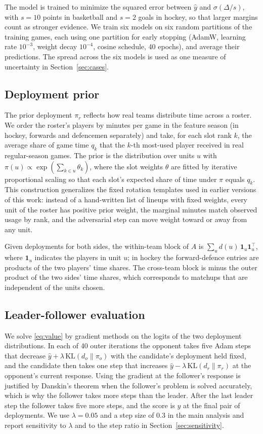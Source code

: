 The model is trained to minimize the squared error between $\hat{y}$ and $\sigma(\Delta/s)$, with $s=10$ points in basketball and $s=2$ goals in hockey, so that larger margins count as stronger evidence. We train six models on six random partitions of the training games, each using one partition for early stopping (AdamW, learning rate $10^{-3}$, weight decay $10^{-4}$, cosine schedule, 40 epochs), and average their predictions. The spread across the six models is used as one measure of uncertainty in Section~\ref{sec:cases}.

\subsection{Deployment prior}
\label{sec:deploy}
The prior deployment $\pi_r$ reflects how real teams distribute time across a roster. We order the roster's players by minutes per game in the feature season (in hockey, forwards and defencemen separately) and take, for each slot rank $k$, the average share of game time $q_k$ that the $k$-th most-used player received in real regular-season games. The prior is the distribution over units $u$ with $\pi(u)\propto\exp(\sum_{k\in u}\theta_k)$, where the slot weights $\theta$ are fitted by iterative proportional scaling so that each slot's expected share of time under $\pi$ equals $q_k$. This construction generalizes the fixed rotation templates used in earlier versions of this work: instead of a hand-written list of lineups with fixed weights, every unit of the roster has positive prior weight, the marginal minutes match observed usage by rank, and the adversarial step can move weight toward or away from any unit.

Given deployments for both sides, the within-team block of $A$ is $\sum_u d(u)\,\mathbf{1}_u\mathbf{1}_u^{\top}$, where $\mathbf{1}_u$ indicates the players in unit $u$; in hockey the forward-defence entries are products of the two players' time shares. The cross-team block is minus the outer product of the two sides' time shares, which corresponds to matchups that are independent of the units chosen.

\subsection{Leader-follower evaluation}
\label{sec:stackelberg}
We solve \eqref{eq:value} by gradient methods on the logits of the two deployment distributions. In each of 40 outer iterations the opponent takes five Adam steps that decrease $\hat{y}+\lambda\,\mathrm{KL}(d_o\|\pi_o)$ with the candidate's deployment held fixed, and the candidate then takes one step that increases $\hat{y}-\lambda\,\mathrm{KL}(d_r\|\pi_r)$ at the opponent's current response. Using the gradient at the follower's response is justified by Danskin's theorem \citep{danskin1967} when the follower's problem is solved accurately, which is why the follower takes more steps than the leader. After the last leader step the follower takes five more steps, and the score is $\hat{y}$ at the final pair of deployments. We use $\lambda=0.05$ and a step size of 0.3 in the main analysis and report sensitivity to $\lambda$ and to the step ratio in Section~\ref{sec:sensitivity}.

